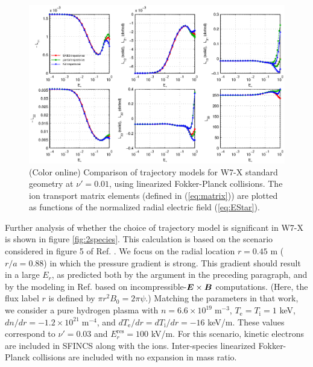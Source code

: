 \documentclass[12pt,superscriptaddress]{revtex4}
\newcommand{\vect}[1]{\mbox{\boldmath $#1$}}
\newcommand{\Ti}{T_{\mathrm{i}}}
\newcommand{\Te}{T_{\mathrm{e}}}
\newcommand{\Erres}{E_r^{\mathrm{res}}}
\begin{document}
\begin{figure}[h!]
\includegraphics{m20131205_05_plotSFINCSFortranErComparisonForPaper_W7X.eps}
\caption{(Color online) Comparison of trajectory models for W7-X standard geometry at $\nu' = 0.01$,
using linearized Fokker-Planck collisions.
The ion transport matrix elements (defined in (\ref{eq:matrix})) are plotted as functions
of the normalized radial electric field (\ref{eq:EStar}).
\label{fig:ErComparison_W7X}}
\end{figure}



Further analysis of whether the choice of trajectory model is significant in W7-X
is shown in figure  \ref{fig:2species}.
This calculation is based on the scenario considered in figure 5 of Ref. \cite{Turkin}. 
We focus on the radial location $r=0.45$ m ($r/a=0.88$)
in which the pressure gradient is strong.  This gradient should result in a large $E_r$, as predicted 
both by the argument in the preceding paragraph, and by
the modeling in Ref. \cite{Turkin} based on incompressible-$\vect{E}\times\vect{B}$ computations.
(Here, the flux label $r$ is defined by $\pi r^2 B_0 = 2 \pi \psi$.)
Matching the parameters in that work, we consider a pure hydrogen plasma with $n=6.6\times 10^{19}\; \mathrm{m}^{-3}$,
$\Te=\Ti=1$ keV, $dn/dr = -1.2\times 10^{21} \;\mathrm{m}^{-4}$, and $d\Te/dr=d\Ti/dr = -16$ keV/m.
These values correspond to $\nu'=0.03$ and $\Erres = 100 $ kV/m.
For this scenario, kinetic electrons are included in SFINCS along with the ions.
Inter-species linearized Fokker-Planck collisions are included with no expansion in mass ratio.
\end{document}
